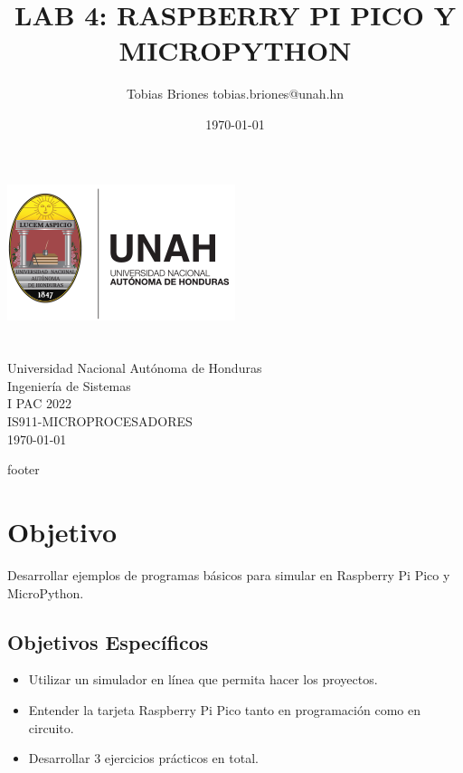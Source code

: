 \documentclass{article}
\title{LAB 4: RASPBERRY PI PICO Y MICROPYTHON}
\author{Tobias Briones \bigbreak tobias.briones@unah.hn}
\date{\today}
\begin{document}
    \makeatletter
    \begin{titlepage}
        \begin{center}
            \includegraphics[width=0.3\linewidth]{images/logo-unah}\\[4ex]
            {\huge \bfseries \@title
            \vspace{1cm}}\\[2ex]
            {\LARGE \@author}\\[50ex]

            {\large
            Universidad Nacional Autónoma de Honduras\\
            Ingeniería de Sistemas\\
            I PAC 2022\\
            IS911-MICROPROCESADORES
            }\\[2ex]

            {\large \today}
        \end{center}
    \end{titlepage}
    \makeatother
    \thispagestyle{empty}
    \newpage

    {footer}

    \section{Objetivo}

    Desarrollar ejemplos de programas básicos para simular en Raspberry Pi
    Pico y MicroPython.

    \subsection{Objetivos Específicos}\label{subsec:objetivos-específicos}

    \begin{itemize}
        \item Utilizar un simulador en línea que permita hacer los proyectos.
        \item Entender la tarjeta Raspberry Pi Pico tanto en programación
        como en circuito.
        \item Desarrollar $3$ ejercicios prácticos en total.
    \end{itemize}
\end{document}
